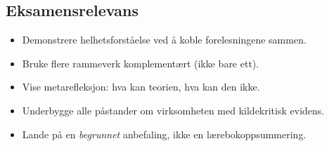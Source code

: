 \subsection{Eksamensrelevans}
\begin{itemize}
  \item Demonstrere helhetsforståelse ved å koble forelesningene sammen.
  \item Bruke flere rammeverk komplementært (ikke bare ett).
  \item Vise metarefleksjon: hva kan teorien, hva kan den ikke.
  \item Underbygge alle påstander om virksomheten med kildekritisk evidens.
  \item Lande på en \emph{begrunnet} anbefaling, ikke en lærebokoppsummering.
\end{itemize}
